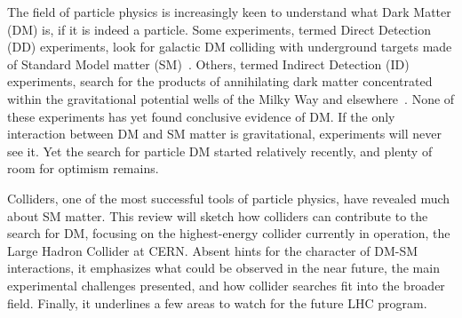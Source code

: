 

The field of particle physics is increasingly keen to understand what Dark Matter (DM) is, if it is indeed a particle. 
Some experiments, termed Direct Detection (DD) experiments, look for galactic DM colliding with underground targets made of Standard Model matter (SM)~\cite{0954-3899-43-1-013001}.
Others, termed Indirect Detection (ID) experiments, search for the products of annihilating dark matter concentrated within the gravitational potential wells of the Milky Way and elsewhere~\cite{Gaskins:2016cha}.
None of these experiments has yet found conclusive evidence of DM.
If the only interaction between DM and SM matter is gravitational, experiments will never see it.
Yet the search for particle DM started relatively recently, and plenty of room for optimism remains.

Colliders, one of the most successful tools of particle physics, have revealed much about SM matter.
This review will sketch how colliders can contribute to the search for DM, focusing on the highest-energy collider currently in operation, the Large Hadron Collider at CERN.
Absent hints for the character of DM-SM interactions, it emphasizes what could be observed in the near future, the main experimental challenges presented, and how collider searches fit into the broader field.
Finally, it underlines a few areas to watch for the future LHC program.









